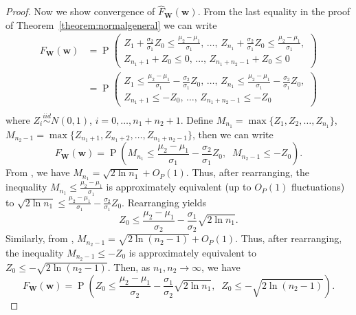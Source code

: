 \documentclass[12pt]{article}
\DeclareMathOperator*{\Prob}{P}
\begin{document}
\begin{proof}
Now we show convergence of $\widehat F_{\mathbf W}(\mathbf w)$. From the last equality in the proof of Theorem~\ref{theorem:normalgeneral} we can write
\begin{align*}
	F_{\mathbf W}(\mathbf w) &= \Prob\!\left(
\begin{array}{l}
Z_{1} + \frac{\sigma_2}{\sigma_1}Z_0 \le \frac{\mu_2 - \mu_1}{\sigma_1},\, \dots,\,
Z_{n_1} + \frac{\sigma_2}{\sigma_1}Z_0 \le \frac{\mu_2 - \mu_1}{\sigma_1},\\[3pt]
Z_{n_1+1}+ Z_0 \le 0,\, \dots,\, Z_{n_1+n_2-1}+Z_0 \le 0
\end{array}
\right) \\
&= \Prob\!\left(
\begin{array}{l}
Z_{1} \le \frac{\mu_2 - \mu_1}{\sigma_1} - \frac{\sigma_2}{\sigma_1}Z_0,\, \dots,\,
Z_{n_1} \le \frac{\mu_2 - \mu_1}{\sigma_1} - \frac{\sigma_2}{\sigma_1}Z_0,\\[3pt]
Z_{n_1+1}\le - Z_0 ,\, \dots,\, Z_{n_1+n_2-1} \le -Z_0
\end{array}
\right) \\
\end{align*}
where $Z_i \overset{iid}{\sim} N(0,1)$, $i=0,\ldots,n_1+n_2+1$. Define $M_{n_1} = \max\{Z_1, Z_2, \dots, Z_{n_1}\}$, $M_{n_2-1} = \max\{Z_{n_1+1}, Z_{n_1+2}, \dots, Z_{n_1+n_2-1}\}$, then we can write
$$ 
F_{\mathbf W}(\mathbf w) = \Prob\left(M_{n_1} \le \frac{\mu_2 - \mu_1}{\sigma_1} - \frac{\sigma_2}{\sigma_1} Z_0,\;\; M_{n_2-1} \le -Z_0\right).	
$$
From \cite{embrechts2013modelling}, we have $M_{n_1} = \sqrt{2 \ln n_1} + O_P(1)$. Thus, after rearranging, the inequality $M_{n_1} \le \frac{\mu_2 - \mu_1}{\sigma_1}$ is approximately equivalent (up to $O_P(1)$ fluctuations) to
$
\sqrt{2 \ln n_1} \leq \frac{\mu_2 - \mu_1}{\sigma_1} - \frac{\sigma_2}{\sigma_1} Z_0.
$
Rearranging yields
$$
Z_0 \leq \frac{\mu_2 - \mu_1}{\sigma_2} - \frac{\sigma_1}{\sigma_2}\sqrt{2 \ln n_1}.
$$
Similarly, from \cite{embrechts2013modelling}, $M_{n_2-1} = \sqrt{2 \ln (n_2-1)} + O_P(1)$. Thus, after rearranging, the inequality $M_{n_2-1} \le -Z_0$ is approximately equivalent to
$
Z_0 \leq -\sqrt{2 \ln (n_2-1)}.
$
Then, as $n_1, n_2 \to \infty$, we have
$$
F_{\mathbf W}(\mathbf w) = \Prob\left(Z_0 \le \frac{\mu_2 - \mu_1}{\sigma_2} - \frac{\sigma_1}{\sigma_2}\sqrt{2 \ln n_1}, \; \; Z_0 \le -\sqrt{2 \ln (n_2-1)}\right).	
$$


\end{proof}
\end{document}

